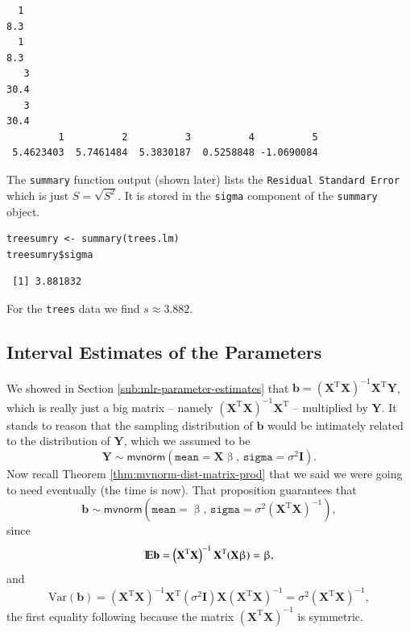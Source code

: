 \documentclass[captions=tableheading]{scrbook}
\begin{document}
\begin{verbatim}
  1 
8.3
  1 
8.3
   3 
30.4
   3 
30.4
         1          2          3          4          5 
 5.4623403  5.7461484  5.3830187  0.5258848 -1.0690084
\end{verbatim}

The \texttt{summary} function output (shown later) lists the \texttt{Residual Standard Error} which is just \(S=\sqrt{S^{2}}\). It is stored in the \texttt{sigma} component of the \texttt{summary} object.


\begin{verbatim}
treesumry <- summary(trees.lm)
treesumry$sigma
\end{verbatim}

\begin{verbatim}
 [1] 3.881832
\end{verbatim}

For the \texttt{trees} data we find \(s\approx  3.882 \).
\subsection{Interval Estimates of the Parameters}
\label{sec-7-2-4}

\label{sub:mlr-interval-est-params}

We showed in Section \ref{sub:mlr-parameter-estimates} that \(\mathbf{b}=\left(\mathbf{X}^{\mathrm{T}}\mathbf{X}\right)^{-1}\mathbf{X}^{\mathrm{T}}\mathbf{Y}\), which is really just a big matrix -- namely \(\left(\mathbf{X}^{\mathrm{T}}\mathbf{X}\right)^{-1}\mathbf{X}^{\mathrm{T}}\) -- multiplied by \(\mathbf{Y}\). It stands to reason that the sampling distribution of \(\mathbf{b}\) would be intimately related to the distribution of \(\mathbf{Y}\), which we assumed to be
\begin{equation}
\mathbf{Y}\sim\mathsf{mvnorm}\left(\mathtt{mean}=\mathbf{X}\upbeta,\,\mathtt{sigma}=\sigma^{2}\mathbf{I}\right).
\end{equation}
Now recall Theorem \ref{thm:mvnorm-dist-matrix-prod} that we said we were going to need eventually (the time is now). That proposition guarantees that
\begin{equation}
\mathbf{b}\sim\mathsf{mvnorm}\left(\mathtt{mean}=\upbeta,\,\mathtt{sigma}=\sigma^{2}\left(\mathbf{X}^{\mathrm{T}}\mathbf{X}\right)^{-1}\right),\label{eq:distn-b-mlr}
\end{equation}
since
\begin{equation}
\mathrm{I\hspace{-1.5pt}E}\mathbf{b}=\left(\mathbf{X}^{\mathrm{T}}\mathbf{X}\right)^{-1}\mathbf{X}^{\mathrm{T}}(\mathbf{X}\upbeta)=\upbeta,
\end{equation}
and
\begin{equation}
\mbox{Var}(\mathbf{b})=\left(\mathbf{X}^{\mathrm{T}}\mathbf{X}\right)^{-1}\mathbf{X}^{\mathrm{T}}(\sigma^{2}\mathbf{I})\mathbf{X}\left(\mathbf{X}^{\mathrm{T}}\mathbf{X}\right)^{-1}=\sigma^{2}\left(\mathbf{X}^{\mathrm{T}}\mathbf{X}\right)^{-1},
\end{equation}
the first equality following because the matrix \(\left(\mathbf{X}^{\mathrm{T}}\mathbf{X}\right)^{-1}\) is symmetric.
\end{document}
